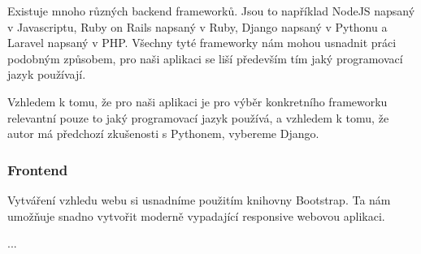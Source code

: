 Existuje mnoho různých backend frameworků.
Jsou to například NodeJS napsaný v Javascriptu, Ruby on Rails napsaný v Ruby, Django napsaný v Pythonu a
Laravel napsaný v PHP. %
Všechny tyté frameworky nám mohou usnadnit práci podobným způsobem, pro naši aplikaci se liší především
tím jaký programovací jazyk používají.

Vzhledem k tomu, že pro naši aplikaci je pro výběr konkretního frameworku relevantní pouze to jaký programovací
jazyk používá, a vzhledem k tomu, že autor má předchozí zkušenosti s Pythonem, vybereme Django.

\subsubsection{Frontend}
Vytváření vzhledu webu si usnadníme použitím knihovny Bootstrap.
Ta nám umožňuje snadno vytvořit moderně vypadající responsive webovou aplikaci. %

...

